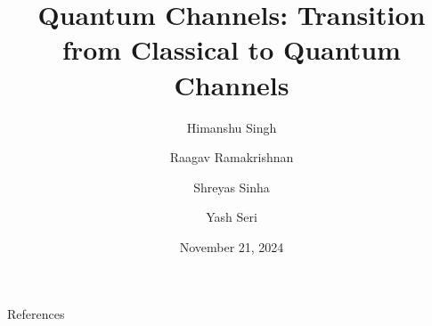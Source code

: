 \documentclass[a4paper, 9pt]{beamer}
\title{Quantum Channels: Transition from Classical to Quantum Channels}
\author{Himanshu Singh \and Raagav Ramakrishnan \and Shreyas Sinha \and Yash Seri}
\date{November 21, 2024}
\newcommand{\pageauthor}{}
\begin{document}
\begin{frame}
    \titlepage
\end{frame}

\begin{frame}
    \tableofcontents
\end{frame}

\renewcommand{\pageauthor}{Shreyas Sinha}


\renewcommand{\pageauthor}{Yash Seri}



\renewcommand{\pageauthor}{Raagav Ramakrishnan}



\renewcommand{\pageauthor}{Himanshu Singh}



\renewcommand{\pageauthor}{Shreyas Sinha}



\renewcommand{\pageauthor}{}
\begin{frame}{References}
   \printbibliography[heading=none]
\end{frame}
\end{document}
